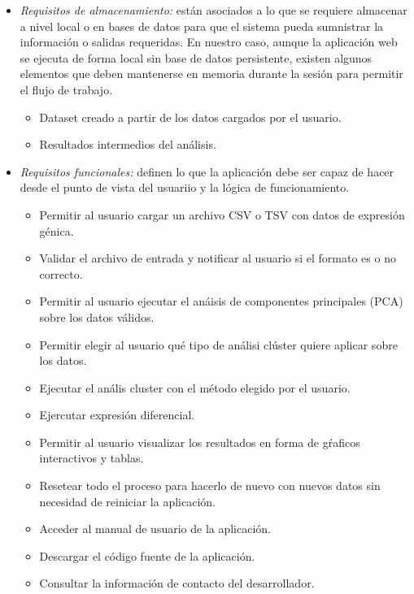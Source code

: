 \begin{itemize}
    \item \textit{Requisitos de almacenamiento: } están asociados a lo que se requiere almacenar a nivel local o en bases de datos para que el sistema
    pueda sumnistrar la información o salidas requeridas. En nuestro caso, aunque la aplicación web se ejecuta de forma local sin base de datos persistente,
    existen algunos elementos que deben mantenerse en memoria durante la sesión para permitir el flujo de trabajo.
    \begin{itemize}
        \item Dataset creado a partir de los datos cargados por el usuario.
        \item Resultados intermedios del análisis.
    \end{itemize}

    \item \textit{Requisitos funcionales: } definen lo que la aplicación debe ser capaz de hacer desde el punto de vista del usuariio y la lógica de funcionamiento.
    \begin{itemize}
        \item Permitir al usuario cargar un archivo CSV o TSV con datos de expresión génica.
        \item Validar el archivo de entrada y notificar al usuario si el formato es o no correcto.
        \item Permitir al usuario ejecutar el anáisis de componentes principales (PCA) sobre los datos válidos.
        \item Permitir elegir al usuario qué tipo de análisi clúster quiere aplicar sobre los datos.
        \item Ejecutar el anális cluster con el método elegido por el usuario.
        \item Ejercutar expresión diferencial.
        \item Permitir al usuario visualizar los resultados en forma de gŕaficos interactivos y tablas.
        \item Resetear todo el proceso para hacerlo de nuevo con nuevos datos sin necesidad de reiniciar la aplicación.
        \item Acceder al manual de usuario de la aplicación.
        \item Descargar el código fuente de la aplicación.
        \item Consultar la información de contacto del desarrollador.
    \end{itemize}


\end{itemize}
